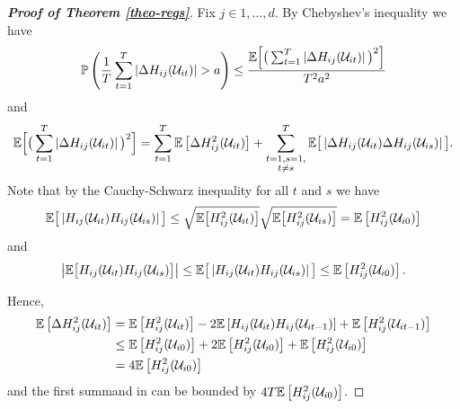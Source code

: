 \documentclass[a4paper,12pt]{article}
\makeatletter
\renewcommand{\eqref}[1]{\tagform@{\ref{#1}}}
\makeatother
\begin{document}
\begin{proof}[\textnormal{\textbf{Proof of Theorem \ref{theo-regs}}}]
Fix $j \in {1, \ldots, d}$. By Chebyshev's inequality we have
\begin{align}\label{theo-regs-proof-3}
\mathbb{P} \left(\frac{1}{T} \sum_{t=1}^T \left|\Delta  H_{ij} (\mathcal{U}_{it})\right| > a \right) \leq \frac{\mathbb{E} \Big[ \big(\sum_{t=1}^T \left|\Delta  H_{ij} (\mathcal{U}_{it})\right|\big)^2 \Big]}{T^2 a^2}
\end{align}
and 
\begin{align}\label{theo-regs-proof-4}
\begin{split}
\mathbb{E} \Big[ \big( \sum_{t=1}^T \left|\Delta  H_{ij} (\mathcal{U}_{it})\right|\big)^2 \Big] =  \sum_{t=1}^T \mathbb{E} \left[ \Delta  H^2_{ij} (\mathcal{U}_{it})  \right] + \sum_{\substack{t=1, s = 1,\\ t\neq s}}^T\mathbb{E} \big[ \left|\Delta  H_{ij} (\mathcal{U}_{it}) \Delta  H_{ij} (\mathcal{U}_{is})\right| \big].
\end{split}
\end{align}
Note that by the Cauchy-Schwarz inequality for all $t$ and $s$ we have
\begin{align*}
 \mathbb{E} \big[ \left| H_{ij}(\mathcal{U}_{it}) H_{ij}(\mathcal{U}_{is})\right| \big] \leq \sqrt{\mathbb{E}\big[ H^2_{ij}(\mathcal{U}_{it})\big]} \sqrt{ \mathbb{E} \big[H^2_{ij}(\mathcal{U}_{is})\big]} = \mathbb{E} \left[ H^2_{ij}(\mathcal{U}_{i0}) \right] 
\end{align*}
and 
\begin{align}\label{theo-regs-proof-5}
 \left|\mathbb{E} \big[ H_{ij}(\mathcal{U}_{it}) H_{ij}(\mathcal{U}_{is}) \big]\right|\leq \mathbb{E} \big[ \left| H_{ij}(\mathcal{U}_{it}) H_{ij}(\mathcal{U}_{is})\right| \big] \leq  \mathbb{E} \left[ H^2_{ij}(\mathcal{U}_{i0}) \right].
\end{align}

Hence, 
\begin{align*}
 \mathbb{E} \left[ \Delta  H^2_{ij} (\mathcal{U}_{it})  \right]  &=  \mathbb{E} \left[ H^2_{ij} (\mathcal{U}_{it}) \right] - 2\mathbb{E} \left[ H_{ij} (\mathcal{U}_{it}) H_{ij}(\mathcal{U}_{it-1}) \right]  + \mathbb{E} \left[ H^2_{ij}(\mathcal{U}_{it-1}) \right] \\
& \leq \mathbb{E} \left[ H^2_{ij} (\mathcal{U}_{i0}) \right] + 2\mathbb{E} \left[ H^2_{ij} (\mathcal{U}_{i0}) \right]  + \mathbb{E} \left[ H^2_{ij}(\mathcal{U}_{i0}) \right] \\
&= 4 \mathbb{E} \left[ H^2_{ij} (\mathcal{U}_{i0}) \right]
\end{align*}
and the first summand in \eqref{theo-regs-proof-4} can be bounded by $4T\mathbb{E} \left[ H^2_{ij} (\mathcal{U}_{i0}) \right]$.


\end{proof}
\end{document}
